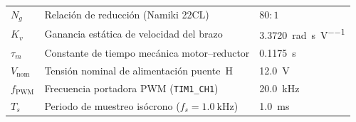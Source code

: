 \begin{table}[!t]
{\begin{tabular}{@{}lll@{}}
$N_g$ & Relación de reducción (Namiki 22CL) & $80:1$ \\
$K_v$ & Ganancia estática de velocidad del brazo & \qty{3.3720}{\radian\per\second\per\volt} \\
$\tau_m$ & Constante de tiempo mecánica motor--reductor & \qty{0.1175}{\second} \\
$V_{\text{nom}}$ & Tensión nominal de alimentación puente~H & \qty{12.0}{\volt} \\
$f_{\text{PWM}}$ & Frecuencia portadora PWM (\texttt{TIM1\_CH1}) & \qty{20.0}{\kilo\hertz} \\
$T_s$ & Periodo de muestreo isócrono ($f_s = \qty{1.0}{\kilo\hertz}$) & \qty{1.0}{\milli\second} \\
\bottomrule
\end{tabular}%
}
\end{table}
